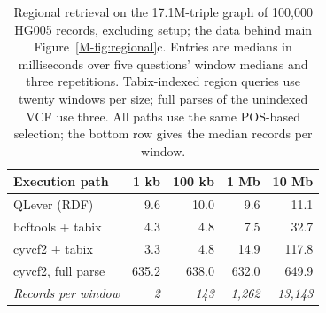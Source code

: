 \documentclass[11pt]{article}
\begin{document}
\begin{table}[!htbp]
\caption{Regional retrieval on the 17.1M-triple graph of 100,000 HG005 records, excluding setup; the data behind main Figure~\ref{M-fig:regional}c. Entries are medians in milliseconds over five questions' window medians and three repetitions. Tabix-indexed region queries use twenty windows per size; full parses of the unindexed VCF use three. All paths use the same POS-based selection; the bottom row gives the median records per window.}\label{tab:regional}%
\centering\footnotesize\setlength{\tabcolsep}{7pt}\renewcommand{\arraystretch}{1.1}%
\begin{tabular}{@{}l r r r r@{}}
\toprule
\textbf{Execution path} & \textbf{1 kb} & \textbf{100 kb} & \textbf{1 Mb} & \textbf{10 Mb}\\
\midrule
QLever (RDF) & 9.6 & 10.0 & 9.6 & 11.1\\
bcftools + tabix & 4.3 & 4.8 & 7.5 & 32.7\\
cyvcf2 + tabix & 3.3 & 4.8 & 14.9 & 117.8\\
cyvcf2, full parse & 635.2 & 638.0 & 632.0 & 649.9\\
\addlinespace[3pt]
\textit{Records per window} & \textit{2} & \textit{143} & \textit{1{,}262} & \textit{13{,}143}\\
\bottomrule
\end{tabular}
\end{table}
\end{document}
